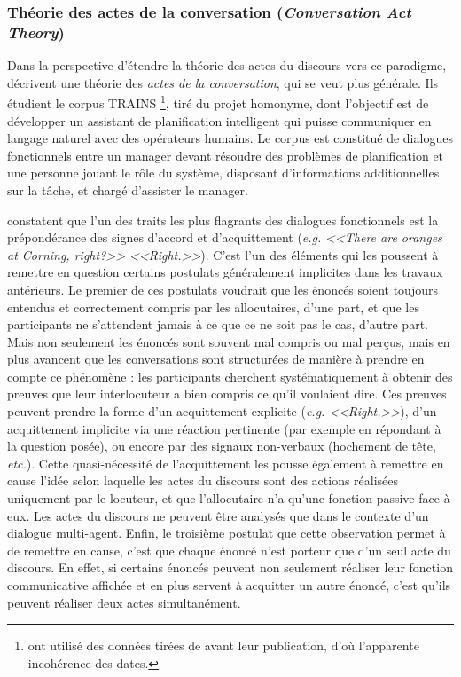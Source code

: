 \documentclass[10pt,a4paper,twoside]{article}
\begin{document}
\subsubsection{Théorie des actes de la conversation (\textit{Conversation Act Theory})}

Dans la perspective d'étendre la théorie des actes du discours vers ce paradigme, \citet{traum1992conversation} décrivent une théorie des \textit{actes de la conversation}, qui se veut plus générale. Ils étudient le corpus TRAINS \cite{gross1993trains}\footnote{\citeauthor{traum1992conversation} ont utilisé des données tirées de \cite{gross1993trains} avant leur publication, d'où l'apparente incohérence des dates.}, tiré du projet homonyme, dont l'objectif est de développer un assistant de planification intelligent qui puisse communiquer en langage naturel avec des opérateurs humains. Le corpus est constitué de dialogues fonctionnels entre un manager devant résoudre des problèmes de planification et une personne jouant le rôle du système, disposant d'informations additionnelles sur la tâche, et chargé d'assister le manager. 

\citeauthor{traum1992conversation} constatent que l'un des traits les plus flagrants des dialogues fonctionnels est la prépondérance des signes d'accord et d'acquittement (\textit{e.g.} \textit{<<There are oranges at Corning, right?>> <<Right.>>}). C'est l'un des éléments qui les poussent à remettre en question certains postulats généralement implicites dans les travaux antérieurs. Le premier de ces postulats voudrait que les énoncés soient toujours entendus et correctement compris par les allocutaires, d'une part, et que les participants ne s'attendent jamais à ce que ce ne soit pas le cas, d'autre part. Mais non seulement les énoncés sont souvent mal compris ou mal perçus, mais en plus \citeauthor{traum1992conversation} avancent que les conversations sont structurées de manière à prendre en compte ce phénomène : les participants cherchent systématiquement à obtenir des preuves que leur interlocuteur a bien compris ce qu'il voulaient dire. Ces preuves peuvent prendre la forme d'un acquittement explicite (\textit{e.g.} \textit{<<Right.>>}), d'un acquittement implicite via une réaction pertinente (par exemple en répondant à la question posée), ou encore par des signaux non-verbaux (hochement de tête, \textit{etc.}). Cette quasi-nécessité de l'acquittement les pousse également à remettre en cause l'idée selon laquelle les actes du discours sont des actions réalisées uniquement par le locuteur, et que l'allocutaire n'a qu'une fonction passive face à eux. Les actes du discours ne peuvent être analysés que dans le contexte d'un dialogue multi-agent. Enfin, le troisième postulat que cette observation permet à \citeauthor{traum1992conversation} de remettre en cause, c'est que chaque énoncé n'est porteur que d'un seul acte du discours. En effet, si certains énoncés peuvent non seulement réaliser leur fonction communicative affichée et en plus servent à acquitter un autre énoncé, c'est qu'ils peuvent réaliser deux actes simultanément.
\end{document}

